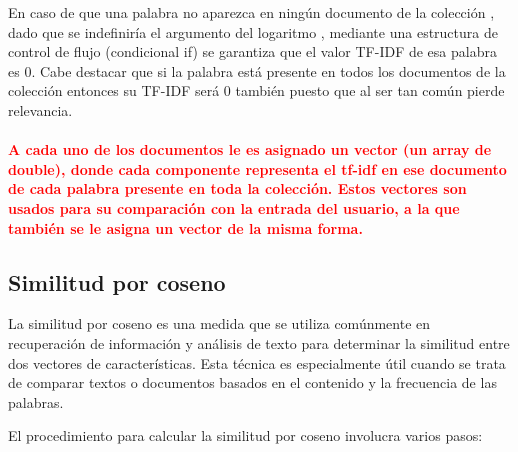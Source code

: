 \documentclass[a4paper, 12pt]{article}
\begin{document}
En caso de que una palabra no aparezca en ningún documento de la colección , dado que se indefiniría el argumento del logaritmo , mediante una estructura de control de flujo (condicional if) se garantiza que el valor TF-IDF de esa palabra es 0. Cabe destacar que si la palabra está presente en todos los documentos de la colección entonces su TF-IDF será 0 también puesto que al ser tan común pierde relevancia.

\paragraph{\textcolor{red}{
A cada uno de los documentos le es asignado un vector (un array de double), donde cada componente representa el tf-idf en ese documento de cada palabra presente en toda la colección. Estos vectores son usados para su comparación con la entrada del usuario, a la que también se le asigna un vector de la misma forma.}}


\subsection{Similitud por coseno}
 La similitud por coseno es una medida que se utiliza comúnmente en recuperación de información y análisis de texto para determinar la similitud entre dos vectores de características. Esta técnica es especialmente útil cuando se trata de comparar textos o documentos basados en el contenido y la frecuencia de las palabras.

El procedimiento para calcular la similitud por coseno involucra varios pasos:
\end{document}
